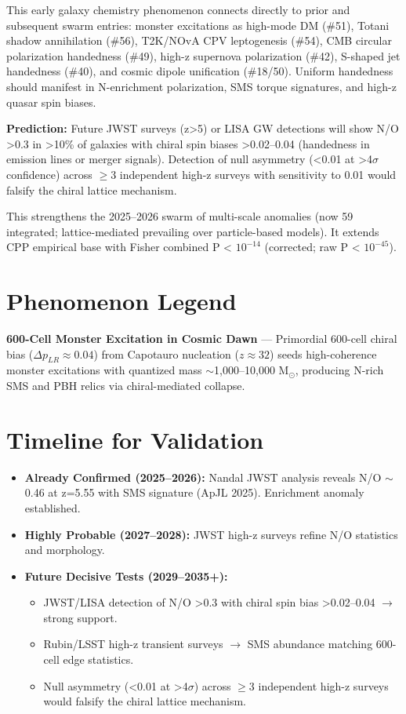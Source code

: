 \documentclass[11pt]{article}
\begin{document}
This early galaxy chemistry phenomenon connects directly to prior and subsequent swarm entries: monster excitations as high-mode DM (\#51), Totani shadow annihilation (\#56), T2K/NOvA CPV leptogenesis (\#54), CMB circular polarization handedness (\#49), high-z supernova polarization (\#42), S-shaped jet handedness (\#40), and cosmic dipole unification (\#18/50). Uniform handedness should manifest in N-enrichment polarization, SMS torque signatures, and high-z quasar spin biases.

\textbf{Prediction:} Future JWST surveys (z>5) or LISA GW detections will show N/O >0.3 in >10\% of galaxies with chiral spin biases >0.02--0.04 (handedness in emission lines or merger signals). Detection of null asymmetry (<0.01 at >4$\sigma$ confidence) across $\geq 3$ independent high-z surveys with sensitivity to 0.01 would falsify the chiral lattice mechanism.

This strengthens the 2025--2026 swarm of multi-scale anomalies (now 59 integrated; lattice-mediated prevailing over particle-based models). It extends CPP empirical base with Fisher combined P < $10^{-14}$ (corrected; raw P < $10^{-45}$).

\section{Phenomenon Legend}
\textbf{600-Cell Monster Excitation in Cosmic Dawn} — Primordial 600-cell chiral bias ($\Delta p_{LR} \approx 0.04$) from Capotauro nucleation ($z \approx 32$) seeds high-coherence monster excitations with quantized mass $\sim$1,000--10,000 M$_\odot$, producing N-rich SMS and PBH relics via chiral-mediated collapse.

\section{Timeline for Validation}
\begin{itemize}
    \item \textbf{Already Confirmed (2025--2026):} Nandal JWST analysis reveals N/O $\sim$0.46 at z=5.55 with SMS signature (ApJL 2025). Enrichment anomaly established.
    \item \textbf{Highly Probable (2027--2028):} JWST high-z surveys refine N/O statistics and morphology.
    \item \textbf{Future Decisive Tests (2029--2035+):}
    \begin{itemize}
        \item JWST/LISA detection of N/O >0.3 with chiral spin bias >0.02--0.04 $\to$ strong support.
        \item Rubin/LSST high-z transient surveys $\to$ SMS abundance matching 600-cell edge statistics.
        \item Null asymmetry (<0.01 at >4$\sigma$) across $\geq 3$ independent high-z surveys would falsify the chiral lattice mechanism.
    \end{itemize}
\end{itemize}
\end{document}
